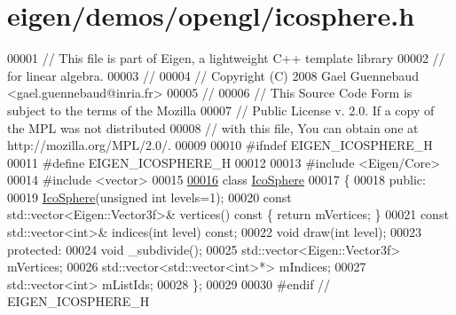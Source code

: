 \hypertarget{eigen_2demos_2opengl_2icosphere_8h_source}{}\section{eigen/demos/opengl/icosphere.h}
\label{eigen_2demos_2opengl_2icosphere_8h_source}

\begin{DoxyCode}
00001 \textcolor{comment}{// This file is part of Eigen, a lightweight C++ template library}
00002 \textcolor{comment}{// for linear algebra.}
00003 \textcolor{comment}{//}
00004 \textcolor{comment}{// Copyright (C) 2008 Gael Guennebaud <gael.guennebaud@inria.fr>}
00005 \textcolor{comment}{//}
00006 \textcolor{comment}{// This Source Code Form is subject to the terms of the Mozilla}
00007 \textcolor{comment}{// Public License v. 2.0. If a copy of the MPL was not distributed}
00008 \textcolor{comment}{// with this file, You can obtain one at http://mozilla.org/MPL/2.0/.}
00009 
00010 \textcolor{preprocessor}{#ifndef EIGEN\_ICOSPHERE\_H}
00011 \textcolor{preprocessor}{#define EIGEN\_ICOSPHERE\_H}
00012 
00013 \textcolor{preprocessor}{#include <Eigen/Core>}
00014 \textcolor{preprocessor}{#include <vector>}
00015 
\hyperlink{class_ico_sphere}{00016} \textcolor{keyword}{class }\hyperlink{class_ico_sphere}{IcoSphere}
00017 \{
00018   \textcolor{keyword}{public}:
00019     \hyperlink{class_ico_sphere}{IcoSphere}(\textcolor{keywordtype}{unsigned} \textcolor{keywordtype}{int} levels=1);
00020     \textcolor{keyword}{const} std::vector<Eigen::Vector3f>& vertices()\textcolor{keyword}{ const }\{ \textcolor{keywordflow}{return} mVertices; \}
00021     \textcolor{keyword}{const} std::vector<int>& indices(\textcolor{keywordtype}{int} level) \textcolor{keyword}{const};
00022     \textcolor{keywordtype}{void} draw(\textcolor{keywordtype}{int} level);
00023   \textcolor{keyword}{protected}:
00024     \textcolor{keywordtype}{void} \_subdivide();
00025     std::vector<Eigen::Vector3f> mVertices;
00026     std::vector<std::vector<int>*> mIndices;
00027     std::vector<int> mListIds;
00028 \};
00029 
00030 \textcolor{preprocessor}{#endif // EIGEN\_ICOSPHERE\_H}
\end{DoxyCode}
